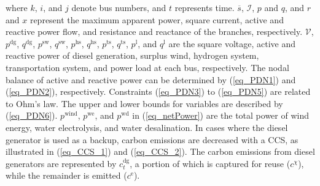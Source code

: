 \documentclass[conference]{IEEEtran}
\begin{document}
where $k$, $i$, and $j$ denote bus numbers, and $t$ represents time. $\overline{s}$, $\mathcal{I}$, $p$ and $q$, and $r$ and $x$ represent the maximum apparent power, square current, active and reactive power flow, and resistance and reactance of the branches, respectively. $\mathcal{V}$, $p^\mathrm{dg}$, $q^\mathrm{dg}$, $p^\mathrm{sw}$, $q^\mathrm{sw}$, $p^\mathrm{hs}$, $q^\mathrm{hs}$, $p^\mathrm{ts}$, $q^\mathrm{ts}$, $p^\mathrm{l}$, and $q^\mathrm{l}$ are the square voltage, active and reactive power of diesel generation, surplus wind, hydrogen system, transportation system, and power load at each bus, respectively. The nodal balance of active and reactive power can be determined by (\ref{eq_PDN1}) and (\ref{eq_PDN2}), respectively. Constraints (\ref{eq_PDN3}) to (\ref{eq_PDN5}) are related to Ohm's law. The upper and lower bounds for variables are described by (\ref{eq_PDN6}).
$p^\mathrm{wind}$, $p^\mathrm{we}$, and $p^\mathrm{wd}$ in (\ref{eq_netPower}) are the total power of wind energy, water electrolysis, and water desalination. In cases where the diesel generator is used as a backup, carbon emissions are decreased with a CCS, as illustrated in (\ref{eq_CCS_1}) and (\ref{eq_CCS_2}). The carbon emissions from diesel generators are represented by $c_t^\textrm{dg}$, a portion of which is captured for reuse ($c^{\chi}$), while the remainder is emitted ($c^\textrm{e}$).
\end{document}
